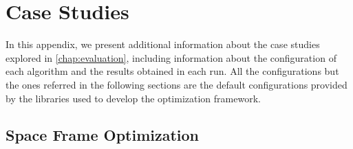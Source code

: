\chapter{Case Studies}
\label{appendix:appendixB}

In this appendix, we present additional information about the case studies explored in \cref{chap:evaluation}, including information about the configuration of each algorithm and the results obtained in each run. All the configurations but the ones referred in the following sections are the default configurations provided by the libraries used to develop the optimization framework.

\section{Space Frame Optimization}
\label{sec:spaceframeoptimizationextra}




